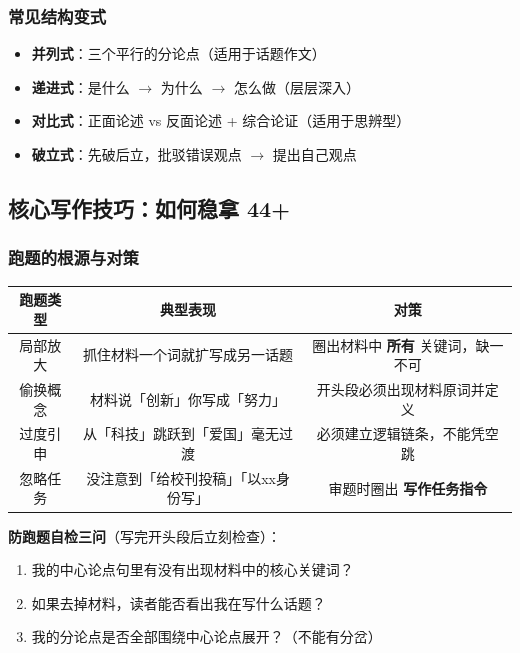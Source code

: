 \subsubsection{常见结构变式}

\begin{itemize}
  \item \textbf{并列式}：三个平行的分论点（适用于话题作文）
  \item \textbf{递进式}：是什么 $\to$ 为什么 $\to$ 怎么做（层层深入）
  \item \textbf{对比式}：正面论述 vs 反面论述 + 综合论证（适用于思辨型）
  \item \textbf{破立式}：先破后立，批驳错误观点 $\to$ 提出自己观点
\end{itemize}

\subsection{核心写作技巧：如何稳拿 44+}

\subsubsection{跑题的根源与对策}

\begin{center}
\begin{tabular}{c|c|c}
\textbf{跑题类型} & \textbf{典型表现} & \textbf{对策} \\ \hline
局部放大 & 抓住材料一个词就扩写成另一话题 & 圈出材料中 \textbf{所有} 关键词，缺一不可 \\
偷换概念 & 材料说「创新」你写成「努力」 & 开头段必须出现材料原词并定义 \\
过度引申 & 从「科技」跳跃到「爱国」毫无过渡 & 必须建立逻辑链条，不能凭空跳 \\
忽略任务 & 没注意到「给校刊投稿」「以xx身份写」 & 审题时圈出 \textbf{写作任务指令} \\
\end{tabular}
\end{center}

\textbf{防跑题自检三问}（写完开头段后立刻检查）：

\begin{enumerate}
  \item 我的中心论点句里有没有出现材料中的核心关键词？
  \item 如果去掉材料，读者能否看出我在写什么话题？
  \item 我的分论点是否全部围绕中心论点展开？（不能有分岔）
\end{enumerate}

